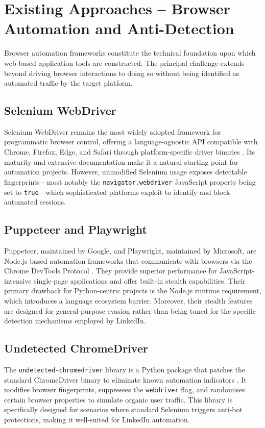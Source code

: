 \documentclass[12pt, a4paper, oneside]{report}
\begin{document}
\section{Existing Approaches -- Browser Automation and Anti-Detection}
\label{sec:category-b}

Browser automation frameworks constitute the technical foundation upon which web-based application tools are constructed. The principal challenge extends beyond driving browser interactions to doing so without being identified as automated traffic by the target platform.

\subsection{Selenium WebDriver}
Selenium WebDriver remains the most widely adopted framework for programmatic browser control, offering a language-agnostic API compatible with Chrome, Firefox, Edge, and Safari through platform-specific driver binaries \cite{ref5}. Its maturity and extensive documentation make it a natural starting point for automation projects. However, unmodified Selenium usage exposes detectable fingerprints---most notably the \texttt{navigator.webdriver} JavaScript property being set to \texttt{true}---which sophisticated platforms exploit to identify and block automated sessions.

\subsection{Puppeteer and Playwright}
Puppeteer, maintained by Google, and Playwright, maintained by Microsoft, are Node.js-based automation frameworks that communicate with browsers via the Chrome DevTools Protocol \cite{ref6}. They provide superior performance for JavaScript-intensive single-page applications and offer built-in stealth capabilities. Their primary drawback for Python-centric projects is the Node.js runtime requirement, which introduces a language ecosystem barrier. Moreover, their stealth features are designed for general-purpose evasion rather than being tuned for the specific detection mechanisms employed by LinkedIn.

\subsection{Undetected ChromeDriver}
The \texttt{undetected-chromedriver} library is a Python package that patches the standard ChromeDriver binary to eliminate known automation indicators \cite{ref7}. It modifies browser fingerprints, suppresses the \texttt{webdriver} flag, and randomises certain browser properties to simulate organic user traffic. This library is specifically designed for scenarios where standard Selenium triggers anti-bot protections, making it well-suited for LinkedIn automation.
\end{document}

